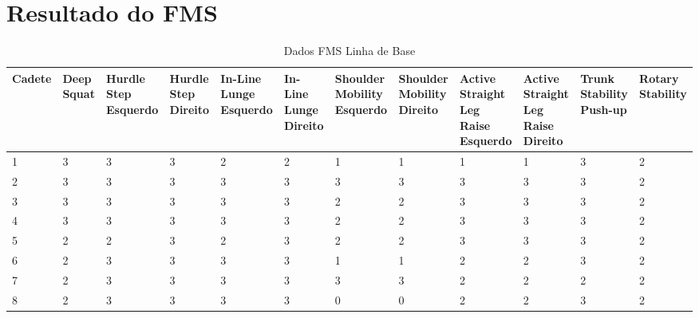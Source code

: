 \begin{landscape}
    \label{ap:fms}
    \chapter{Resultado do \acrshort{FMS}}
    
    \begin{table}[h]
        \centering
        \caption{Dados FMS Linha de Base}
        \label{tab:fmsBase}
        \renewcommand{\arraystretch}{1.3}  %
        \begin{adjustbox}{scale=0.9}
        \begin{tabular}{|p{1.8cm}|p{1.6cm}|p{1.6cm}|p{1.6cm}|p{1.6cm}|p{1.6cm}|p{1.6cm}|p{1.6cm}|p{1.6cm}|p{1.6cm}|p{1.6cm}|p{1.6cm}|}
            \hline
            \textbf{Cadete} & \textbf{Deep Squat} & \textbf{Hurdle Step Esquerdo} & \textbf{Hurdle Step Direito} & \textbf{In-Line Lunge Esquerdo} & \textbf{In-Line Lunge Direito} & \textbf{Shoulder Mobility Esquerdo} & \textbf{Shoulder Mobility Direito} & \textbf{Active Straight Leg Raise Esquerdo} & \textbf{Active Straight Leg Raise Direito} & \textbf{Trunk Stability Push-up} & \textbf{Rotary Stability} \\
            \hline
            1 & 3 & 3 & 3 & 2 & 2 & 1 & 1 & 1 & 1 & 3 & 2 \\
            2 & 3 & 3 & 3 & 3 & 3 & 3 & 3 & 3 & 3 & 3 & 2 \\
            3 & 3 & 3 & 3 & 3 & 3 & 2 & 2 & 3 & 3 & 3 & 2 \\
            4 & 3 & 3 & 3 & 3 & 3 & 2 & 2 & 3 & 3 & 3 & 2 \\
            5 & 2 & 2 & 3 & 2 & 3 & 2 & 2 & 3 & 3 & 3 & 2 \\
            6 & 2 & 3 & 3 & 3 & 3 & 1 & 1 & 2 & 2 & 3 & 2 \\
            7 & 2 & 3 & 3 & 3 & 3 & 3 & 3 & 2 & 2 & 2 & 2 \\
            8 & 2 & 3 & 3 & 3 & 3 & 0 & 0 & 2 & 2 & 3 & 2 \\
            \hline
        \end{tabular}
        \end{adjustbox}
    \end{table}
    

\end{landscape}
